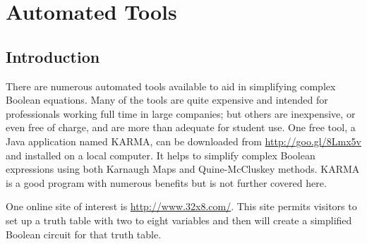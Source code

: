 \clearpage\section{Automated Tools}
\label{ASM:sec:automated_tools}

\subsection{Introduction}
\label{ASM:subsec:introduction_to_automated_tools}

There are numerous automated tools available to aid in simplifying complex Boolean equations. Many of the tools are quite expensive and intended for professionals working full time in large companies; but others are inexpensive, or even free of charge, and are more than adequate for student use. One free tool, a Java application named \ac{KARMA}, can be downloaded from \url{http://goo.gl/8Lmx5v} and installed on a local computer. It helps to simplify complex Boolean expressions using both Karnaugh Maps and Quine-McCluskey methods. \ac{KARMA} is a good program with numerous benefits but is not further covered here.

One online site of interest is \url{http://www.32x8.com/}. This site permits visitors to set up a truth table with two to eight variables and then will create a simplified Boolean circuit for that truth table.

